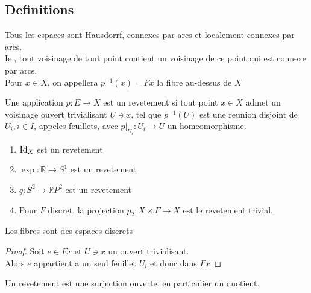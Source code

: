 \documentclass[../main.tex]{subfiles}
\begin{document}
\subsection{Definitions}
Tous les espaces sont Hausdorrf, connexes par arcs et localement connexes par arcs.\\
Ie.,  tout voisinage de tout point contient un voisinage de ce point qui est connexe par arcs.\\
Pour $x\in X$, on appellera $p^{-1}( x) = Fx$ la fibre au-dessus de $X$ 
\begin{defn}
	Une application $p: E \to X$ est un revetement si tout point $x\in X$ admet un voisinage ouvert trivialisant $U \ni x$, tel que $p^{-1}( U) $ est une reunion disjoint de $U_i, i \in I$, appeles feuillets, avec $p|_{U_i} : U_i \to U$ un homeomorphisme.
\end{defn}
\begin{exemples}
\begin{enumerate}
\item $\operatorname{Id}_X$ est un revetement
\item $\exp : \mathbb{R}\to S^{1}$ est un revetement
\item $q: S^{2} \to \mathbb{R}P^{2}$ est un revetement
\item Pour $F$ discret, la projection $p_2 : X\times F\to X$ est le revetement trivial.
\end{enumerate}

\end{exemples}
\begin{lemma}
Les fibres sont des espaces discrets
\end{lemma}
\begin{proof}
Soit $e\in Fx$ et $U\ni x$ un ouvert trivialisant.\\
Alors $e$ appartient a un seul feuillet $U_i$ et donc dans $Fx$ 
\end{proof}
\begin{propo}
Un revetement est une surjection ouverte, en particulier un quotient. 
\end{propo}


	
\end{document}

